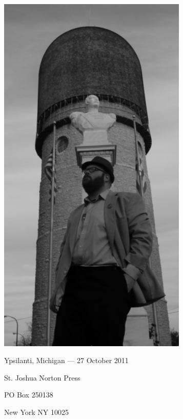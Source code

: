 \documentclass[12pt]{article}
\begin{document}
\begin{center}
\includegraphics[height=500pt]{thank-you-ypsilant-small.png}

Ypsilanti, Michigan --- 27 October 2011
\end{center}


\newpage

\thispagestyle{empty}
\vspace*{12cm}
\begin{sideways}
\Large{St. Joshua Norton Press}
\end{sideways}
\begin{sideways}
\Large{PO Box 250138}
\end{sideways}
\begin{sideways}
\Large{New York NY 10025}
\end{sideways}
\end{document}
